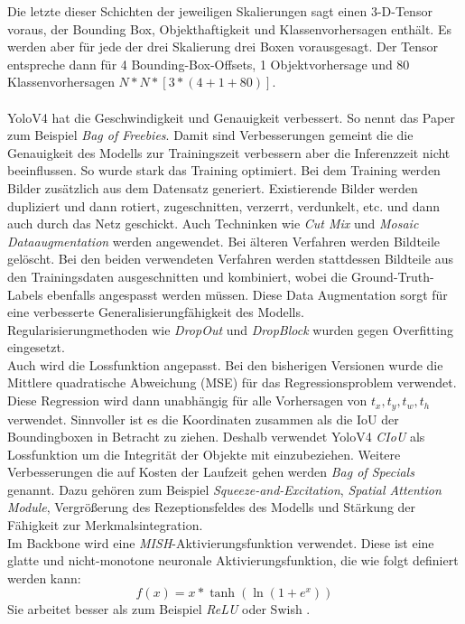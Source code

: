 \documentclass[conference]{IEEEtran}
\begin{document}
	Die letzte dieser Schichten der jeweiligen Skalierungen sagt einen 3-D-Tensor voraus, der Bounding Box, Objekthaftigkeit und Klassenvorhersagen enthält. Es werden aber für jede der drei Skalierung drei Boxen vorausgesagt. Der Tensor entspreche dann für 4 Bounding-Box-Offsets, 1 Objektvorhersage und 80 Klassenvorhersagen $N*N*[3*(4 + 1 + 80)]$.\cite{b4}\\
	\\
	YoloV4 hat die Geschwindigkeit und Genauigkeit verbessert. So nennt das Paper \cite{b2} zum Beispiel \textit{Bag of Freebies}. Damit sind Verbesserungen gemeint die die Genauigkeit des Modells zur Trainingszeit verbessern aber die Inferenzzeit nicht beeinflussen. So wurde stark das Training optimiert. Bei dem Training werden Bilder zusätzlich aus dem Datensatz generiert. Existierende Bilder werden dupliziert und dann rotiert, zugeschnitten, verzerrt, verdunkelt, etc. und dann auch durch das Netz geschickt. 
	Auch Techninken wie \textit{Cut Mix} und \textit{Mosaic Dataaugmentation} werden angewendet. Bei älteren Verfahren werden Bildteile gelöscht. Bei den beiden verwendeten Verfahren werden stattdessen Bildteile aus den Trainingsdaten ausgeschnitten und kombiniert, wobei die Ground-Truth-Labels ebenfalls angespasst werden müssen. Diese Data Augmentation sorgt für eine verbesserte Generalisierungfähigkeit des Modells.\\
	Regularisierungmethoden wie \textit{DropOut} und \textit{DropBlock} wurden gegen Overfitting eingesetzt.\\
	Auch wird die Lossfunktion angepasst. Bei den bisherigen Versionen wurde die Mittlere quadratische Abweichung (MSE) für das Regressionsproblem verwendet. Diese Regression wird dann unabhängig für alle Vorhersagen von $t_x, t_y, t_w, t_h$ verwendet. Sinnvoller ist es die Koordinaten zusammen als die IoU der Boundingboxen in Betracht zu ziehen. Deshalb verwendet YoloV4 \textit{CIoU} als Lossfunktion um die Integrität der Objekte mit einzubeziehen.
	Weitere Verbesserungen die auf Kosten der Laufzeit gehen werden \textit{Bag of Specials} genannt. Dazu gehören zum Beispiel \textit{Squeeze-and-Excitation}, \textit{Spatial Attention Module}, Vergrößerung des Rezeptionsfeldes des Modells und Stärkung der Fähigkeit zur Merkmalsintegration.\\
	Im Backbone wird eine \textit{MISH}-Aktivierungsfunktion verwendet. Diese ist eine glatte und nicht-monotone neuronale Aktivierungsfunktion, die wie folgt definiert werden kann:
	\[ f(x) = x* \tanh (\ln (1+e^x)) \]
	Sie arbeitet besser als zum Beispiel \textit{ReLU} oder Swish \cite{b7}.\\
\end{document}
